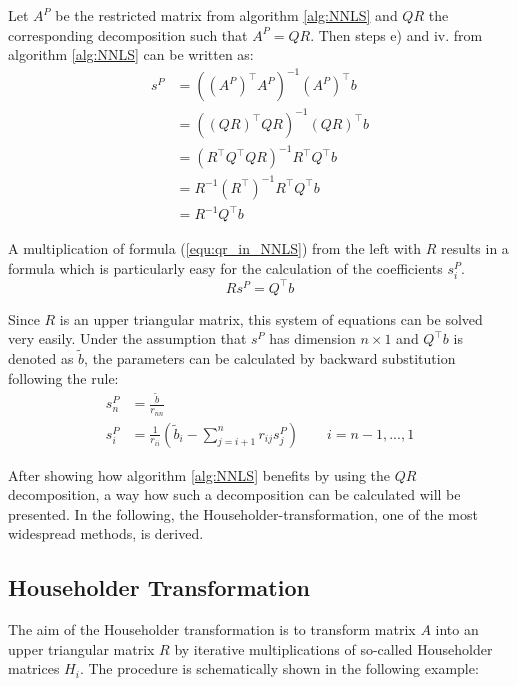 \begin{remark}\label{rem:qr_in_NNLS} 
	Let $A^P$ be the restricted matrix from algorithm \ref{alg:NNLS} and $QR$ the corresponding decomposition such that $A^P = QR$. Then steps e) and iv. from algorithm \ref{alg:NNLS} can be written as:
	\begin{equation}\label{equ:qr_in_NNLS}
		\begin{aligned}
			 s^P 	&= ((A^P)^\top A^P)^{-1} (A^P)^\top b \\
			 		&= ((QR)^\top QR)^{-1} (QR)^\top b \\
			 		&= (R^\top Q^\top Q R)^{-1} R^\top Q^\top b \\
			 		&= R^{-1} (R^\top)^{-1} R^\top Q^\top b \\
			 		&= R^{-1} Q^\top b
		\end{aligned}
	\end{equation}
\end{remark}

A multiplication of formula (\ref{equ:qr_in_NNLS}) from the left with $R$ results in a formula which is particularly easy for the calculation of the coefficients $s^P_i$.
\begin{equation}\label{equ:qr_in_NNLS_opt}
	R s^P = Q^\top b
\end{equation}

Since $R$ is an upper triangular matrix, this system of equations can be solved very easily. Under the assumption that $s^P$ has dimension $n \times 1$ and $Q^\top b$ is denoted as $\tilde{b}$, the parameters can be calculated by backward substitution following the rule:
\begin{align*}
	s^P_n 	&= \frac{\tilde{b}}{r_{nn}} \\
	s^P_i	&= \frac{1}{r_{ii}} \left( \tilde{b}_i - \sum_{j = i + 1}^{n} r_{ij} s^P_j\right) \quad \quad i = n-1, ..., 1
\end{align*}

After showing how algorithm \ref{alg:NNLS} benefits by using the $QR$ decomposition, a way how such a decomposition can be calculated will be presented. In the following, the Householder-transformation, one of the most widespread methods, is derived.

\subsection{Householder Transformation}  

The aim of the Householder transformation is to transform matrix $A$ into an upper triangular matrix $R$ by iterative multiplications of so-called Householder matrices $H_i$. 
The procedure is schematically shown in the following example: 

